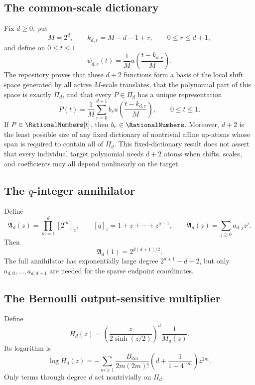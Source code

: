 \documentclass[11pt,oneside]{article}
\theoremstyle{definition}
\theoremstyle{remark}
\begin{document}
\subsection{The common-scale dictionary}
Fix $d\ge0$, put
\begin{equation}
 M=2^d,
 \qquad k_{d,r}=M-d-1+r,
 \qquad 0\le r\le d+1,
 \label{eq:kdr}
\end{equation}
and define on $0\le t\le1$
\begin{equation}
 \psi_{d,r}(t)=\frac1M
 u\!\left(\frac{t-k_{d,r}}{M}\right).
 \label{eq:psi-t}
\end{equation}
The repository proves that these $d+2$ functions form a basis of the local
shift space generated by all active $M$-scale translates, that the polynomial
part of this space is exactly $\Pi_d$, and that every $P\in\Pi_d$ has a unique
representation
\begin{equation}
 \boxed{
 P(t)=\frac1M\sum_{r=0}^{d+1}b_r
 u\!\left(\frac{t-k_{d,r}}M\right),
 \qquad0\le t\le1.}
 \label{eq:polynomial-endpoint}
\end{equation}
If $P\in\RationalNumbers[t]$, then $b_r\in\RationalNumbers$.  Moreover, $d+2$ is the least possible
size of any fixed dictionary of nontrivial affine up-atoms whose span is
required to contain all of $\Pi_d$.  This fixed-dictionary result does not
assert that every individual target polynomial needs $d+2$ atoms when shifts,
scales, and coefficients may all depend nonlinearly on the target.

\subsection{The $q$-integer annihilator}
Define
\begin{equation}
 \mathfrak A_d(z)=\prod_{m=1}^{d}[2^m]_z,
 \qquad [q]_z=1+z+\cdots+z^{q-1},
 \qquad
 \mathfrak A_d(z)=\sum_{j\ge0}a_{d,j}z^j.
 \label{eq:q-annihilator}
\end{equation}
Then
\begin{equation}
 \mathfrak A_d(1)=2^{d(d+1)/2}.
 \label{eq:A1}
\end{equation}
The full annihilator has exponentially large degree
$2^{d+1}-d-2$, but only $a_{d,0},\ldots,a_{d,d+1}$ are needed for the sparse
endpoint coordinates.

\subsection{The Bernoulli output-sensitive multiplier}
Define
\begin{equation}
 H_d(z)=\left(\frac{z}{2\sinh(z/2)}\right)^d\frac1{M_u(z)}.
 \label{eq:Hd}
\end{equation}
Its logarithm is
\begin{equation}
 \boxed{
 \log H_d(z)=
 -\sum_{m\ge1}\frac{B_{2m}}{2m(2m)!}
 \left(d+\frac1{1-4^{-m}}\right)z^{2m}.}
 \label{eq:Hd-log}
\end{equation}
Only terms through degree $d$ act nontrivially on $\Pi_d$.
\end{document}
